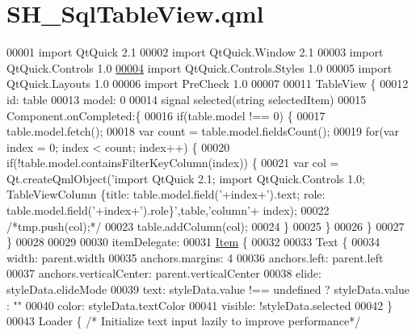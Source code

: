 \hypertarget{SH__SqlTableView_8qml}{\section{S\-H\-\_\-\-Sql\-Table\-View.\-qml}
\label{SH__SqlTableView_8qml}
}

\begin{DoxyCode}
00001 \textcolor{keyword}{import} QtQuick 2.1
00002 import QtQuick.Window 2.1
00003 import QtQuick.Controls 1.0
\hypertarget{SH__SqlTableView_8qml_source_l00004}{}\hyperlink{classSH__SqlTableView}{00004} import QtQuick.Controls.Styles 1.0
00005 import QtQuick.Layouts 1.0
00006 import PreCheck 1.0
00007 
00011 TableView \{
00012     \textcolor{keywordtype}{id}: table
00013     model: 0
00014     signal selected(\textcolor{keywordtype}{string} selectedItem)
00015     Component.onCompleted:\{
00016         \textcolor{keywordflow}{if}(table.model !== 0) \{
00017             table.model.fetch();
00018             var count = table.model.fieldsCount();
00019             \textcolor{keywordflow}{for}(var index = 0; index < count; index++) \{
00020                 \textcolor{keywordflow}{if}(!table.model.containsFilterKeyColumn(index)) \{
00021                     var col = Qt.createQmlObject(\textcolor{stringliteral}{'import QtQuick 2.1; import QtQuick.Controls 1.0;
       TableViewColumn \{title: table.model.field('}+index+\textcolor{stringliteral}{').text; role: table.model.field('}+index+\textcolor{stringliteral}{').role\}'},table,\textcolor{stringliteral}{'column'}+
      index);
00022                     \textcolor{comment}{/*tmp.push(col);*/}
00023                     table.addColumn(col);
00024                 \}
00025             \}
00026         \}
00027     \}
00028 
00029 
00030     itemDelegate:
00031         \hyperlink{classItem}{Item} \{
00032 
00033         Text \{
00034             width: parent.width
00035             anchors.margins: 4
00036             anchors.left: parent.left
00037             anchors.verticalCenter: parent.verticalCenter
00038             elide: styleData.elideMode
00039             text: styleData.value !== undefined ? styleData.value : \textcolor{stringliteral}{""}
00040             color: styleData.textColor
00041             visible: !styleData.selected
00042         \}
00043         Loader \{ \textcolor{comment}{/* Initialize text input lazily to improve performance*/}

\end{DoxyCode}
